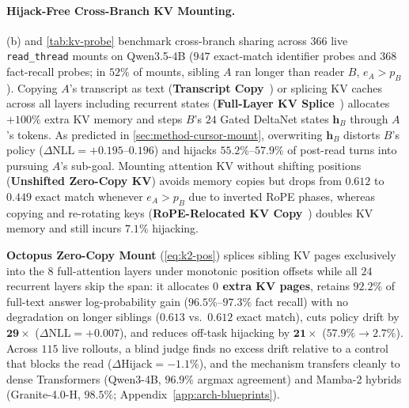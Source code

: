 \documentclass{article}
\begin{document}
\paragraph{Hijack-Free Cross-Branch KV Mounting.}
(b) and \cref{tab:kv-probe} benchmark cross-branch sharing across $366$ live \texttt{read\_thread} mounts on Qwen3.5-4B ($947$ exact-match identifier probes and $368$ fact-recall probes; in $52\%$ of mounts, sibling $A$ ran longer than reader $B$, $e_A > p_B$). Copying $A$'s transcript as text (\textbf{Transcript Copy}~\citep{wu2023autogen}) or splicing KV caches across all layers including recurrent states (\textbf{Full-Layer KV Splice}~\citep{yao2025cacheblend}) allocates $+100\%$ extra KV memory and steps $B$'s $24$ Gated DeltaNet states $\mathbf{h}_B$ through $A$'s tokens. As predicted in \cref{sec:method-cursor-mount}, overwriting $\mathbf{h}_B$ distorts $B$'s policy ($\Delta\text{NLL} = +0.195\text{--}0.196$) and hijacks $55.2\%$--$57.9\%$ of post-read turns into pursuing $A$'s sub-goal. Mounting attention KV without shifting positions (\textbf{Unshifted Zero-Copy KV}) avoids memory copies but drops from $0.612$ to $0.449$ exact match whenever $e_A > p_B$ due to inverted RoPE phases, whereas copying and re-rotating keys (\textbf{RoPE-Relocated KV Copy}~\citep{rodionov2025hogwild,ye2025kvcomm}) doubles KV memory and still incurs $7.1\%$ hijacking.

\textbf{Octopus Zero-Copy Mount} (\cref{eq:k2-pos}) splices sibling KV pages exclusively into the $8$ full-attention layers under monotonic position offsets while all $24$ recurrent layers skip the span: it allocates \textbf{$0$ extra KV pages}, retains $\mathbf{92.2\%}$ of full-text answer log-probability gain ($96.5\%$--$97.3\%$ fact recall) with no degradation on longer siblings ($0.613$ vs.\ $0.612$ exact match), cuts policy drift by $\mathbf{29\times}$ ($\Delta\text{NLL} = +0.007$), and reduces off-task hijacking by $\mathbf{21\times}$ ($57.9\% \to \mathbf{2.7\%}$). Across $115$ live rollouts, a blind judge finds no excess drift relative to a control that blocks the read ($\Delta\text{Hijack} = -1.1\%$), and the mechanism transfers cleanly to dense Transformers (Qwen3-4B, $\mathbf{96.9\%}$ argmax agreement) and Mamba-2 hybrids (Granite-4.0-H, $\mathbf{98.5\%}$; Appendix~\ref{app:arch-blueprints}).
\end{document}
